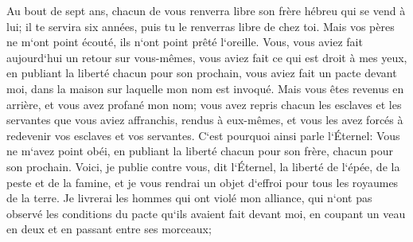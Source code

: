 \verse Au bout de sept ans, chacun de vous renverra libre son frère hébreu qui se vend à lui; il te servira six années, puis tu le renverras libre de chez toi. Mais vos pères ne m`ont point écouté, ils n`ont point prêté l`oreille. 
\verse Vous, vous aviez fait aujourd`hui un retour sur vous-mêmes, vous aviez fait ce qui est droit à mes yeux, en publiant la liberté chacun pour son prochain, vous aviez fait un pacte devant moi, dans la maison sur laquelle mon nom est invoqué. 
\verse Mais vous êtes revenus en arrière, et vous avez profané mon nom; vous avez repris chacun les esclaves et les servantes que vous aviez affranchis, rendus à eux-mêmes, et vous les avez forcés à redevenir vos esclaves et vos servantes. 
\verse C`est pourquoi ainsi parle l`Éternel: Vous ne m`avez point obéi, en publiant la liberté chacun pour son frère, chacun pour son prochain. Voici, je publie contre vous, dit l`Éternel, la liberté de l`épée, de la peste et de la famine, et je vous rendrai un objet d`effroi pour tous les royaumes de la terre. 
\verse Je livrerai les hommes qui ont violé mon alliance, qui n`ont pas observé les conditions du pacte qu`ils avaient fait devant moi, en coupant un veau en deux et en passant entre ses morceaux; 
